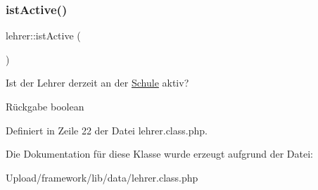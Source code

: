 \subsubsection{\texorpdfstring{ist\+Active()}{istActive()}}
{\footnotesize\ttfamily lehrer\+::ist\+Active (\begin{DoxyParamCaption}{ }\end{DoxyParamCaption})}

Ist der Lehrer derzeit an der \mbox{\hyperlink{class_schule}{Schule}} aktiv? \begin{DoxyReturn}{Rückgabe}
boolean 
\end{DoxyReturn}


Definiert in Zeile 22 der Datei lehrer.\+class.\+php.



Die Dokumentation für diese Klasse wurde erzeugt aufgrund der Datei\+:\begin{DoxyCompactItemize}
\item 
Upload/framework/lib/data/lehrer.\+class.\+php\end{DoxyCompactItemize}

